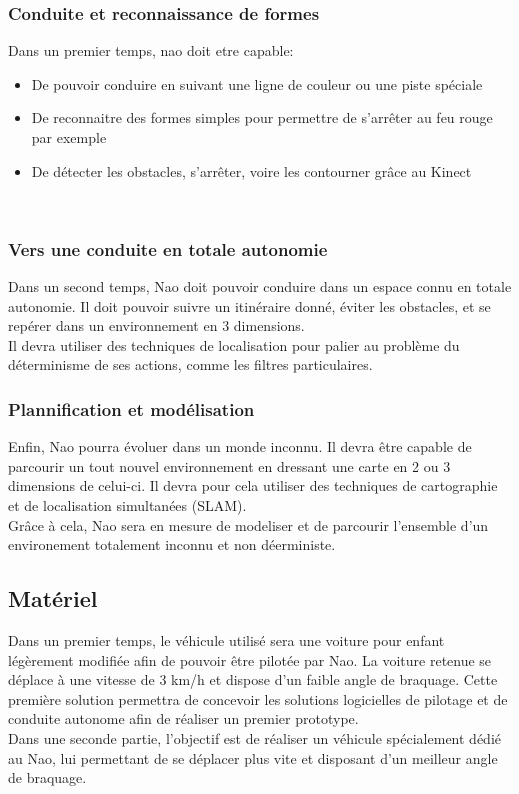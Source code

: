 \documentclass[11pt]{report} %
\begin{document}
			\subsubsection{Conduite et reconnaissance de formes}
				Dans un premier temps, nao doit etre capable:
				\begin{itemize}
				\item De pouvoir conduire en suivant une ligne de couleur ou une piste spéciale
				\item De reconnaitre des formes simples pour permettre de s'arrêter au feu rouge par exemple
				\item De détecter les obstacles, s'arrêter, voire les contourner grâce au Kinect
				\end{itemize}\
			\subsubsection{Vers une conduite en totale autonomie}
				Dans un second temps, Nao doit pouvoir conduire dans un espace connu en totale autonomie.
				Il doit pouvoir suivre un itinéraire donné, éviter les obstacles, et se repérer dans un environnement en 3 dimensions.\\
				Il devra utiliser des techniques de localisation pour palier au problème du déterminisme de ses actions, comme les filtres particulaires.
			\subsubsection{Plannification et modélisation}
				Enfin, Nao pourra évoluer dans un monde inconnu. Il devra être capable de parcourir un tout nouvel environnement en dressant une carte en 2 ou 3 dimensions de celui-ci. Il devra pour cela utiliser des techniques de cartographie et de localisation simultanées (SLAM).\\
				Grâce à cela, Nao sera en mesure de modeliser et de parcourir l'ensemble d'un environement totalement inconnu et non déerministe.
		\subsection{Matériel}
			Dans un premier temps, le véhicule utilisé sera une voiture pour enfant légèrement modifiée afin de pouvoir être pilotée par Nao. La voiture retenue se déplace à une vitesse de 3 km/h et dispose d'un faible angle de braquage. Cette première solution permettra de concevoir les solutions logicielles de pilotage et de conduite autonome afin de réaliser un premier prototype.\\
			Dans une seconde partie, l'objectif est de réaliser un véhicule spécialement dédié au Nao, lui permettant de se déplacer plus vite et disposant d'un meilleur angle de braquage.
\end{document}

